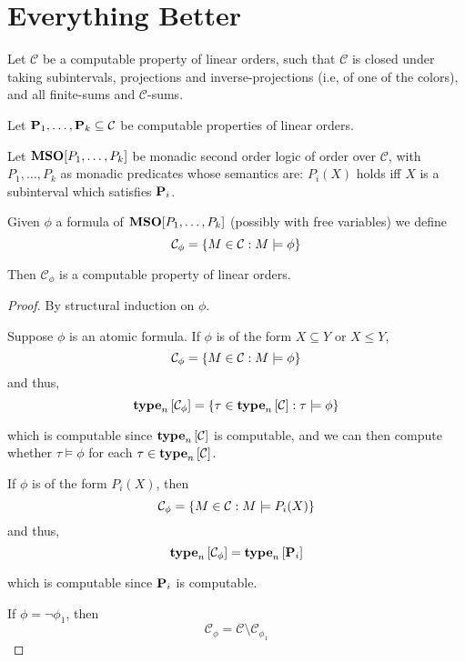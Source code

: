 \section{Everything Better}

\begin{theorem}
    Let $\mathcal{C}$ be a computable property of linear orders,
    such that $\mathcal{C}$ is closed under taking subintervals,
    projections and inverse-projections (i.e, of one of the colors), and all finite-sums and $\mathcal{C}$-sums.

    Let $\mathbf{P}_1, \ldots, \mathbf{P}_k \subseteq \mathcal{C}$ be
    computable properties of linear orders.

    Let $\mathbf{MSO}[P_1, \ldots, P_k]$ be monadic second order logic of order
    over $\mathcal{C}$,
    with $P_1, \ldots, P_k$ as monadic predicates whose semantics are:
    $P_i(X)$ holds iff $X$ is a subinterval which satisfies $\mathbf{P}_i$.

    Given $\phi$ a formula of $\mathbf{MSO}[P_1, \ldots, P_k]$ (possibly with free variables)
    we define \[ \mathcal{C}_{\phi} = \left\{ {M \in \mathcal{C} : M \models \phi} \right\} \]

    Then $\mathcal{C}_{\phi}$ is a computable property of linear orders.
\end{theorem}

\begin{proof}
    By structural induction on $\phi$.

    Suppose $\phi$ is an atomic formula.
    If $\phi$ is of the form $X \subseteq Y$ or $X \le Y$,
    \[
        \mathcal{C}_{\phi} = \left\{ {M \in \mathcal{C} : M \models \phi} \right\}
    \]
    and thus,
    \[
        \mathbf{type}_{n} \left[ {\mathcal{C}_{\phi}} \right] = \left\{ {\tau \in \mathbf{type}_{n} \left[ {\mathcal{C}} \right] : \tau \models \phi} \right\}
    \]

    which is computable since $\mathbf{type}_{n} \left[ {\mathcal{C}} \right]$ is computable,
    and we can then compute whether $\tau \models \phi$ for each $\tau \in \mathbf{type}_{n} \left[ {\mathcal{C}} \right]$.

    If $\phi$ is of the form $P_i(X)$,
    then
    \[
        \mathcal{C}_{\phi} = \left\{ {M \in \mathcal{C} : M \models P_i(X)} \right\}
    \]
    and thus,
    \[
        \mathbf{type}_{n} \left[ {\mathcal{C}_{\phi}} \right] = \mathbf{type}_{n} \left[ {\mathbf{P}_i} \right]
    \]

    which is computable since $\mathbf{P}_i$ is computable.

    If $\phi = \neg \phi_1$,
    then
    \[
        \mathcal{C}_{\phi} = \mathcal{C} \setminus \mathcal{C}_{\phi_1}
    \]

\end{proof}